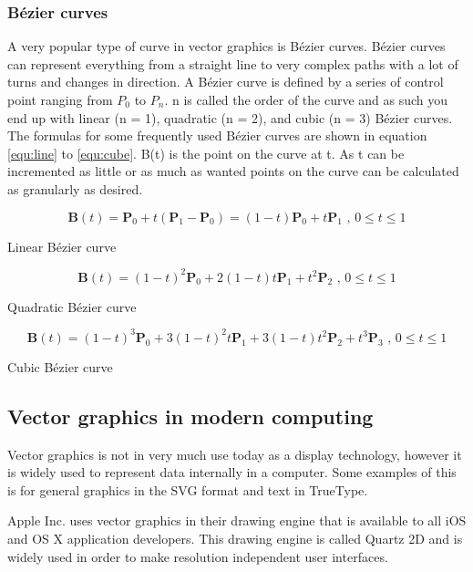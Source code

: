 \subsubsection{Bézier curves}
\label{sec:bezier}
A very popular type of curve in vector graphics is Bézier curves.
Bézier curves can represent everything from a straight line to very complex paths with a lot of turns and changes in direction.
A Bézier curve is defined by a series of control point ranging from \(P_0\) to \(P_n\). 
n is called the order of the curve and as such you end up with linear (n = 1), quadratic (n = 2), and cubic (n = 3) Bézier curves.
The formulas for some frequently used Bézier curves are shown in equation \ref{equ:line} to \ref{equ:cube}. 
B(t) is the point on the curve at t.
As t can be incremented as little or as much as wanted points on the curve can be calculated as granularly as desired.

\begin{cequation}[H]
	\begin{equation}
	    \label{equ:line}
		\mathbf{B}(t)=\mathbf{P}_0 + t(\mathbf{P}_1-\mathbf{P}_0)=(1-t)\mathbf{P}_0 + t\mathbf{P}_1 \mbox{ , } 0 \le t \le 1
	\end{equation}
	\caption{Linear Bézier curve}
\end{cequation}

\begin{cequation}[H]
	\begin{equation}
		\mathbf{B}(t) = (1 - t)^{2}\mathbf{P}_0 + 2(1 - t)t\mathbf{P}_1 + t^{2}\mathbf{P}_2 \mbox{ , } 0 \le t \le 1
	\end{equation}
	\caption{Quadratic Bézier curve}
\end{cequation}

\begin{cequation}[H]
	\begin{equation}
	    \label{equ:cube}
		\mathbf{B}(t)=(1-t)^3\mathbf{P}_0+3(1-t)^2t\mathbf{P}_1+3(1-t)t^2\mathbf{P}_2+t^3\mathbf{P}_3 \mbox{ , } 0 \le t \le 1
	\end{equation}
	\caption{Cubic Bézier curve}
\end{cequation}

\subsection{Vector graphics in modern computing}

Vector graphics is not in very much use today as a display technology, however it is widely used to represent data internally in a computer.
Some examples of this is for general graphics in the SVG format and text in TrueType\cite{truetype}.

Apple Inc.\cite{apple} uses vector graphics in their drawing engine that is available to all iOS and OS X application developers. 
This drawing engine is called Quartz 2D\cite{quartz2d} and is widely used in order to make resolution independent user interfaces.
